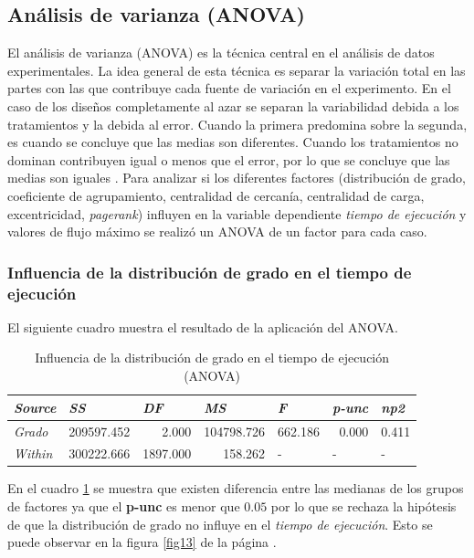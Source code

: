 \documentclass{article}
\begin{document}
\subsection{Análisis de varianza (ANOVA)}
El análisis de varianza (ANOVA) es la técnica central en el análisis de datos experimentales. La idea general de esta técnica es separar la variación total en las partes con las que contribuye cada fuente de variación en el experimento. En el caso de los diseños completamente al azar se separan la variabilidad debida a los tratamientos y la debida al error. Cuando la primera predomina sobre la segunda, es cuando se concluye que las medias son diferentes. Cuando los tratamientos no dominan contribuyen igual o menos que el error, por lo que se concluye que las medias son iguales \cite{ade}.
%
Para analizar si los diferentes factores (distribución de grado, coeficiente de agrupamiento, centralidad de cercanía, centralidad de carga, excentricidad, \textit{pagerank}) influyen en la variable dependiente \textit{tiempo de ejecución} y valores de flujo máximo se realizó un ANOVA de un factor para cada caso. 

\subsubsection{Influencia de la distribución de grado en el tiempo de ejecución}
El siguiente cuadro muestra el resultado de la aplicación del ANOVA.
\begin{table}[htbp]
  \centering
  \caption{Influencia de la distribución de grado en el tiempo de ejecución (ANOVA)}
    \begin{tabular}{lrrrlll}
    \toprule
    \textit{\textbf{Source}} & \multicolumn{1}{l}{\textit{\textbf{SS}}} & \multicolumn{1}{l}{\textit{\textbf{DF}}} & \multicolumn{1}{l}{\textit{\textbf{MS}}} & \textit{\textbf{F}} & \textit{\textbf{p-unc}} & \textit{\textbf{np2}} \\
    \midrule
    \textit{Grado} & 209597.452 & 2.000 & 104798.726 & \multicolumn{1}{r}{662.186} & \multicolumn{1}{r}{0.000} & \multicolumn{1}{r}{0.411} \\
    \textit{Within} & 300222.666 & 1897.000 & 158.262 & -     & -     & - \\
    \bottomrule
    \end{tabular}%
  \label{tab:tab3}%
\end{table}%

En el cuadro \ref{tab:tab3} se muestra que existen diferencia entre las medianas de los grupos de factores ya que el {\bf p-unc} es menor que $0.05$ por lo que se rechaza la hipótesis de que la distribución de grado no influye en el \textit{tiempo de ejecución}. Esto se puede observar en la figura \ref{fig13} de la página \pageref{fig13}. 
\end{document}
